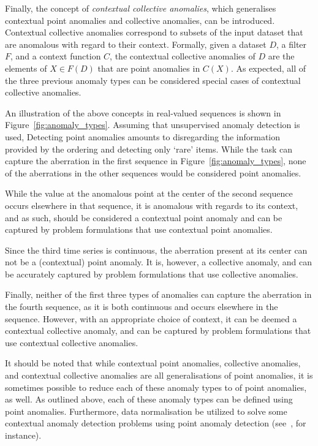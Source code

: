 Finally, the concept of \emph{contextual collective anomalies}, which generalises contextual point anomalies and collective anomalies, can be introduced. Contextual collective anomalies correspond to subsets of the input dataset that are anomalous with regard to their context. Formally, given a dataset $D$, a filter $F$, and a context function $C$, the contextual collective anomalies of $D$ are the elements of $X \in F(D)$ that are point anomalies in $C(X)$. As expected, all of the three previous anomaly types can be considered special cases of contextual collective anomalies.

An illustration of the above concepts in real-valued sequences is shown in Figure~\ref{fig:anomaly_types}. Assuming that unsupervised anomaly detection is used, Detecting point anomalies amounts to disregarding the information provided by the ordering and detecting only `rare' items. While the task can capture the aberration in the first sequence in Figure~\ref{fig:anomaly_types}, none of the aberrations in the other sequences would be considered point anomalies.

While the value at the anomalous point at the center of the second sequence occurs elsewhere in that sequence, it is anomalous with regards to its context, and as such, should be considered a contextual point anomaly and can be captured by problem formulations that use contextual point anomalies.

Since the third time series is continuous, the aberration present at its center can not be a (contextual) point anomaly. It is, however, a collective anomaly, and can be accurately captured by problem formulations that use collective anomalies.

Finally, neither of the first three types of anomalies can capture the aberration in the fourth sequence, as it is both continuous and occurs elsewhere in the sequence. However, with an appropriate choice of context, it can be deemed a contextual collective anomaly, and can be captured by problem formulations that use contextual collective anomalies.

It should be noted that while contextual point anomalies, collective anomalies, and contextual collective anomalies are all generalisations of point anomalies, it is sometimes possible to reduce each of these anomaly types to of point anomalies, as well. As outlined above, each of these anomaly types can be defined using point anomalies. Furthermore, data normalisation be utilized to solve some contextual anomaly detection problems using point anomaly detection (see~\cite{meckesheimer}, for instance).

